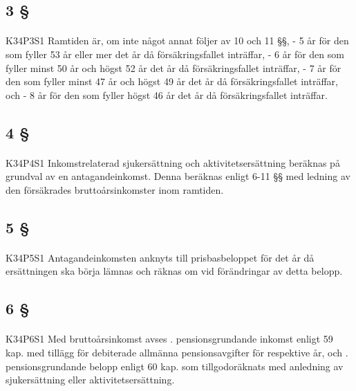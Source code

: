 \documentclass[a4paper,notitlepage,openany,10pt]{book}
\begin{document}
\subsection*{3 §}
\paragraph*{}
{\tiny K34P3S1}
Ramtiden är, om inte något annat följer av 10 och 11 §§,
\newline - 5 år för den som fyller 53 år eller mer det år då försäkringsfallet inträffar,
\newline - 6 år för den som fyller minst 50 år och högst 52 år det år då försäkringsfallet inträffar,
\newline - 7 år för den som fyller minst 47 år och högst 49 år det år då försäkringsfallet inträffar, och
\newline - 8 år för den som fyller högst 46 år det år då försäkringsfallet inträffar.
\subsection*{4 §}
\paragraph*{}
{\tiny K34P4S1}
Inkomstrelaterad sjukersättning och aktivitetsersättning beräknas på grundval av en antagandeinkomst. Denna beräknas enligt 6-11 §§ med ledning av den försäkrades bruttoårsinkomster inom ramtiden.
\subsection*{5 §}
\paragraph*{}
{\tiny K34P5S1}
Antagandeinkomsten anknyts till prisbasbeloppet för det år då ersättningen ska börja lämnas och räknas om vid förändringar av detta belopp.
\subsection*{6 §}
\paragraph*{}
{\tiny K34P6S1}
Med bruttoårsinkomst avses
. pensionsgrundande inkomst enligt 59 kap. med tillägg för debiterade allmänna pensionsavgifter för respektive år, och
. pensionsgrundande belopp enligt 60 kap. som tillgodoräknats med anledning av sjukersättning eller aktivitetsersättning.
\end{document}
